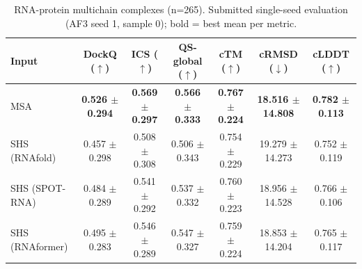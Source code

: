 \begin{table}[htbp]
\centering
\caption{RNA-protein multichain complexes (n=265). Submitted single-seed evaluation (AF3 seed 1, sample 0); bold = best mean per metric.}
\label{tab:rna_protein_multichain_complexes}
\begin{tabular}{lcccccc}
\toprule
Input & DockQ ($\uparrow$) & ICS ($\uparrow$) & QS-global ($\uparrow$) & cTM ($\uparrow$) & cRMSD ($\downarrow$) & cLDDT ($\uparrow$) \\
\midrule
MSA & \textbf{0.526 $\pm$ 0.294} & \textbf{0.569 $\pm$ 0.297} & \textbf{0.566 $\pm$ 0.333} & \textbf{0.767 $\pm$ 0.224} & \textbf{18.516 $\pm$ 14.808} & \textbf{0.782 $\pm$ 0.113} \\
SHS (RNAfold) & 0.457 $\pm$ 0.298 & 0.508 $\pm$ 0.308 & 0.506 $\pm$ 0.343 & 0.754 $\pm$ 0.229 & 19.279 $\pm$ 14.273 & 0.752 $\pm$ 0.119 \\
SHS (SPOT-RNA) & 0.484 $\pm$ 0.289 & 0.541 $\pm$ 0.292 & 0.537 $\pm$ 0.332 & 0.760 $\pm$ 0.223 & 18.956 $\pm$ 14.528 & 0.766 $\pm$ 0.106 \\
SHS (RNAformer) & 0.495 $\pm$ 0.283 & 0.546 $\pm$ 0.289 & 0.547 $\pm$ 0.327 & 0.759 $\pm$ 0.224 & 18.853 $\pm$ 14.204 & 0.765 $\pm$ 0.117 \\
\bottomrule
\end{tabular}
\end{table}
